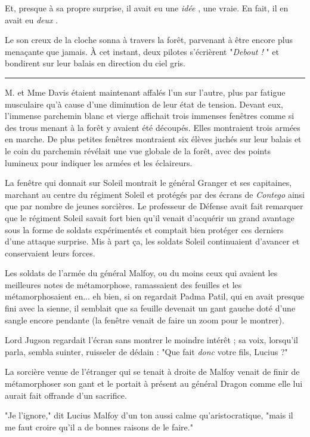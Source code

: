 Et, presque à sa propre surprise, il avait eu une \emph{idée} , une vraie. En fait, il en avait eu \emph{deux} .

Le son creux de la cloche sonna à travers la forêt, parvenant à être encore plus menaçante que jamais. À cet instant, deux pilotes s'écrièrent "\emph{Debout !} " et bondirent sur leur balais en direction du ciel gris.
\par\noindent\rule{\textwidth}{0.4pt}
M. et Mme Davis étaient maintenant affalés l'un sur l'autre, plus par fatigue musculaire qu'à cause d'une diminution de leur état de tension. Devant eux, l'immense parchemin blanc et vierge affichait trois immenses fenêtres comme si des trous menant à la forêt y avaient été découpés. Elles montraient trois armées en marche. De plus petites fenêtres montraient six élèves juchés sur leur balais et le coin du parchemin révélait une vue globale de la forêt, avec des points lumineux pour indiquer les armées et les éclaireurs.

La fenêtre qui donnait sur Soleil montrait le général Granger et ses capitaines, marchant au centre du régiment Soleil et protégés par des écrans de \emph{Contego}  ainsi que par nombre de jeunes sorcières. Le professeur de Défense avait fait remarquer que le régiment Soleil savait fort bien qu'il venait d'acquérir un grand avantage sous la forme de soldats expérimentés et comptait bien protéger ces derniers d'une attaque surprise. Mis à part ça, les soldats Soleil continuaient d'avancer et conservaient leurs forces.

Les soldats de l'armée du général Malfoy, ou du moins ceux qui avaient les meilleures notes de métamorphose, ramassaient des feuilles et les métamorphosaient en... eh bien, si on regardait Padma Patil, qui en avait presque fini avec la sienne, il semblait que sa feuille devenait un gant gauche doté d'une sangle encore pendante (la fenêtre venait de faire un zoom pour le montrer).

Lord Jugson regardait l'écran sans montrer le moindre intérêt ; sa voix, lorsqu'il parla, sembla suinter, ruisseler de dédain : "Que fait \emph{donc}  votre fils, Lucius ?"

La sorcière venue de l'étranger qui se tenait à droite de Malfoy venait de finir de métamorphoser son gant et le portait à présent au général Dragon comme elle lui aurait fait offrande d'un sacrifice.

"Je l'ignore," dit Lucius Malfoy d'un ton aussi calme qu'aristocratique, "mais il me faut croire qu'il a de bonnes raisons de le faire."

